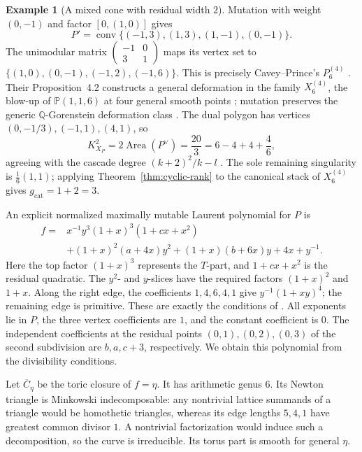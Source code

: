 \documentclass[11pt]{article}
\theoremstyle{plain}
\theoremstyle{definition}
\newtheorem{example}[theorem]{Example}
\theoremstyle{remark}
\newcommand{\Q}{\mathbb Q}
\newcommand{\Pj}{\mathbb P}
\newcommand{\1}{\mathbf 1}
\begin{document}
\begin{example}[A mixed cone with residual width $2$]
Mutation with weight $(0,-1)$ and factor $[0,(1,0)]$ gives
\[
P'=\operatorname{conv}\{(-1,3),(1,3),(1,-1),(0,-1)\}.
\]
The unimodular matrix $\left(\begin{smallmatrix}-1&0\\3&1\end{smallmatrix}\right)$ maps its vertex set to $\{(1,0),(0,-1),(-1,2),(-1,6)\}$.  This is precisely Cavey--Prince's $P_6^{(4)}$ \cite[Section 4.1]{CP}.  Their Proposition~4.2 constructs a general deformation in the family $X_6^{(4)}$, the blow-up of $\Pj(1,1,6)$ at four general smooth points \cite[Definition 2.7]{CP}; mutation preserves the generic $\Q$-Gorenstein deformation class \cite[Theorem 3]{ACC+}.  The dual polygon has vertices $(0,-1/3),(-1,1),(4,1)$, so
\[
K_{X_P}^2=2\operatorname{Area}(P^\vee)=\frac{20}{3}
=6-4+4+\frac46,
\]
agreeing with the cascade degree $(k+2)^2/k-l$ \cite[Remark 2.8]{CP}.  The sole remaining singularity is $\frac16(1,1)$; applying Theorem~\ref{thm:cyclic-rank} to the canonical stack of $X_6^{(4)}$ gives $g_{\mathrm{cat}}=1+2=3$.

An explicit normalized maximally mutable Laurent polynomial for $P$ is
\[
\boxed{\begin{aligned}
f={}&x^{-1}y^3(1+x)^3(1+cx+x^2)\\
&+(1+x)^2(a+4x)y^2+(1+x)(b+6x)y+4x+y^{-1}.
\end{aligned}}
\]
Here the top factor $(1+x)^3$ represents the $T$-part, and $1+cx+x^2$ is the residual quadratic.  The $y^2$- and $y$-slices have the required factors $(1+x)^2$ and $1+x$.  Along the right edge, the coefficients $1,4,6,4,1$ give $y^{-1}(1+xy)^4$; the remaining edge is primitive.  These are exactly the conditions of \cite[Propositions 3.7 and 3.9]{CKPT}.  All exponents lie in $P$, the three vertex coefficients are $1$, and the constant coefficient is $0$.  The independent coefficients at the residual points $(0,1),(0,2),(0,3)$ of the second subdivision are $b,a,c+3$, respectively.  We obtain this polynomial from the divisibility conditions.

Let $\overline C_\eta$ be the toric closure of $f=\eta$.  It has arithmetic genus $6$.  Its Newton triangle is Minkowski indecomposable: any nontrivial lattice summands of a triangle would be homothetic triangles, whereas its edge lengths $5,4,1$ have greatest common divisor $1$.  A nontrivial factorization would induce such a decomposition, so the curve is irreducible.  Its torus part is smooth for general $\eta$.


\end{example}
\end{document}

